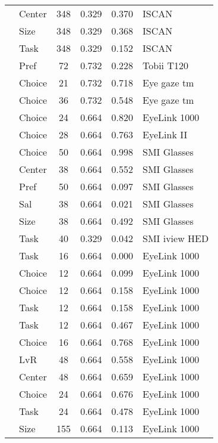 \begin{longtable}{p{8cm}lcccl}
  \cite{chandon2009a} & Center & 348 & 0.329 & 0.370 & ISCAN \\ 
  \cite{chandon2009a} & Size & 348 & 0.329 & 0.368 & ISCAN \\ 
  \cite{chandon2009a} & Task & 348 & 0.329 & 0.152 & ISCAN \\ 
  \cite{du2014} & Pref & 72 & 0.732 & 0.228 & Tobii T120 \\ 
  \cite{fiedler2012} & Choice & 21 & 0.732 & 0.718 & Eye gaze tm \\ 
  \cite{fiedler2012} & Choice & 36 & 0.732 & 0.548 & Eye gaze tm \\ 
  \cite{folke2016} & Choice & 24 & 0.664 & 0.820 & EyeLink 1000 \\ 
  \cite{folke2016} & Choice & 28 & 0.664 & 0.763 & EyeLink II \\ 
  \cite{gidloef2017a} & Choice & 50 & 0.664 & 0.998 & SMI Glasses \\ 
  \cite{gidloef2017a} & Center & 38 & 0.664 & 0.552 & SMI Glasses \\ 
  \cite{gidloef2017a} & Pref & 50 & 0.664 & 0.097 & SMI Glasses \\ 
  \cite{gidloef2017a} & Sal & 38 & 0.664 & 0.021 & SMI Glasses \\ 
  \cite{gidloef2017a} & Size & 38 & 0.664 & 0.492 & SMI Glasses \\ 
  \cite{gidlof2013} & Task & 40 & 0.329 & 0.042 & SMI iview HED \\ 
  \cite{glaholt2009a} & Task & 16 & 0.664 & 0.000 & EyeLink 1000 \\ 
  \cite{glaholt2009b} & Choice & 12 & 0.664 & 0.099 & EyeLink 1000 \\ 
  \cite{glaholt2009b} & Choice & 12 & 0.664 & 0.158 & EyeLink 1000 \\ 
  \cite{glaholt2009b} & Task & 12 & 0.664 & 0.158 & EyeLink 1000 \\ 
  \cite{glaholt2009b} & Task & 12 & 0.664 & 0.467 & EyeLink 1000 \\ 
  \cite{glaholt2009c} & Choice & 16 & 0.664 & 0.768 & EyeLink 1000 \\ 
  \cite{glaholt2010} & LvR & 48 & 0.664 & 0.558 & EyeLink 1000 \\ 
  \cite{glaholt2010} & Center & 48 & 0.664 & 0.659 & EyeLink 1000 \\ 
  \cite{glaholt2012} & Choice & 24 & 0.664 & 0.676 & EyeLink 1000 \\ 
  \cite{glaholt2012} & Task & 24 & 0.664 & 0.478 & EyeLink 1000 \\ 
  \cite{graham2016} & Size & 155 & 0.664 & 0.113 & EyeLink 1000 \\ 

\end{longtable}
